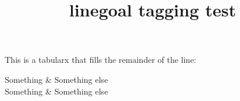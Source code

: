 \documentclass{article}
\title{linegoal tagging test}
\begin{document}
This is a tabularx that fills the remainder of the line:
\begin{tabularx}\hline
Something & Something else \\
Something & Something else \\\hline
\end{tabularx}
\end{document}
